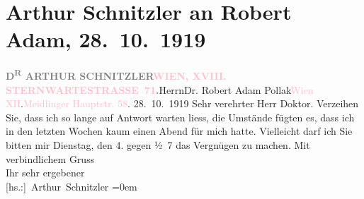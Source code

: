 

               \section[Arthur Schnitzler an Robert Adam, 28. 10. 1919]{ Arthur Schnitzler an Robert Adam, 28. 10. 1919}\nopagebreak{}\rehead{ }\normalsize\beginnumbering{} \toendnotes[C]{\smallbreak\pagebreak[2]} 
\pstart{}{\pb}\textcolor{gray}{\textbf{D\textsuperscript{R} ARTHUR SCHNITZLER}}\pend{}\pstart{}\textcolor{gray}{\textbf{\textcolor{pink}{WIEN, XVIII. STERNWARTESTRASSE 71}{}\ledrightnote{\textcolor{pink}{Sternwartestraße}}.}}\pend{}{\bigskip}\pstart{}Herrn\pend{}\pstart{}Dr. Robert Adam Pollak\pend{}\pstart{}\textcolor{pink}{Wien XII}{}\ledrightnote{\textcolor{pink}{XII., Meidling}}.\pend{}\pstart{}\textcolor{pink}{Meidlinger Hauptstr. 58}{}\ledrightnote{\textcolor{pink}{Meidlinger Hauptstraße}}.\pend{}{\bigskip}\pstart
           \raggedleft{}{\pb}28. 10. 1919\pend
           \pstart{}Sehr verehrter Herr Doktor.\pend\pstart
           Verzeihen Sie, dass ich so lange auf Antwort warten liess, die Umstände fügten
                    es, dass ich in den letzten Wochen kaum einen Abend für mich hatte. Vielleicht
                    darf ich Sie bitten mir Dienstag, den 4. gegen ½ 7 das
                    Vergnügen zu machen.\pend
           \pstart
           Mit verbindlichem Gruss{\\[\baselineskip]}Ihr sehr ergebener{\\[\baselineskip]}\spacefill\mbox{{[}hs.:{]} Arthur Schnitzler}\pend
           \leftskip=0em{}\endnumbering{}  
      